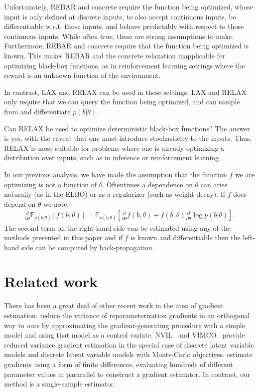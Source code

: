 \documentclass{article}
\newcommand{\E}{\mathbb{E}}
\newcommand{\PT}{\frac{\partial}{\partial \theta}}
\newcommand{\LAX}{{\textnormal{LAX}}}
\newcommand{\RELAX}{{\textnormal{RELAX}}}
\begin{document}
Unfortunately, REBAR and concrete require the function being optimized, whose input is only defined at discrete inputs, to also accept continuous inputs, be differentiable w.r.t. those inputs, and behave predictably with respect to those continuous inputs.
While often true, these are strong assumptions to make.
Furthermore, REBAR and concrete require that the function being optimized is known. 
This makes REBAR and the concrete relaxation inapplicable for optimizing black-box functions, as in reinforcement learning settings where the reward is an unknown function of the environment.

In contrast, \LAX{} and \RELAX{} can be used in these settings.
\LAX{} and \RELAX{} only require that we can query the function being optimized, and can sample from and differentiate $p(b|\theta)$.

Can \RELAX{} be used to optimize deterministic black-box functions?
The answer is yes, with the caveat that one must introduce stochasticity to the inputs.
Thus, \RELAX{} is most suitable for problems where one is already optimizing a distribution over inputs, such as in inference or reinforcement learning.

In our previous analysis, we have made the assumption that the function $f$ we are optimizing is not a function of $\theta$. Oftentimes a dependence on $\theta$ can arise naturally (as in the ELBO) or as a regularizer (such as weight-decay). If $f$ does depend on $\theta$ we note:
\begin{align}
\PT \E_{p(b|\theta)}[f(b, \theta)] = \E_{p(b|\theta)}\left[\PT f(b, \theta) + f(b, \theta)\PT \log p(b|\theta) \right].\nonumber
\end{align}
The second term on the right-hand side can be estimated using any of the methods presented in this paper and if $f$ is known and differentiable then the left-hand side can be computed by back-propagation.


\section{Related work}
There has been a great deal of other recent work in the area of gradient estimation.
\citet{miller2017reducing} reduce the variance of reparameterization gradients in an orthogonal way to ours by approximating the gradient-generating procedure with a simple model and using that model as a control variate.
NVIL~\citep{mnih2014neural} and VIMCO~\citep{mnih2016variational} provide reduced variance gradient estimation in the special case of discrete latent variable models and discrete latent variable models with Monte-Carlo objectives.
\citet{salimans2017evolution} estimate gradients using a form of finite differences, evaluating hundreds of different parameter values in pararallel to construct a gradient estimator.
In contrast, our method is a single-sample estimator.
\end{document}
